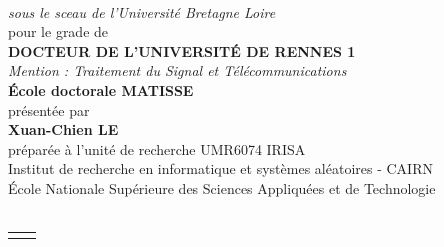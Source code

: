 \documentclass[10pt]{book}
\begin{document}
\begin{titlepage}
\begin{center}
\begin{minipage}{\glarg}
\vspace{0.5cm}
\\ \vspace{0mm}\emph{\Large sous le sceau de l'Universit\'e Bretagne Loire}\\ \vspace{0.5cm}
{\Large pour le grade de}\\ \vspace{2mm}
{\Large\bf DOCTEUR DE L'UNIVERSIT\'E DE RENNES 1}\\ \vspace{0.4cm}
\emph{\Large Mention :  Traitement du Signal et T\'el\'ecommunications}\\ \vspace{2mm}
{\Large\bf \'Ecole doctorale MATISSE}\\ \vspace{0.3cm}
{\Large pr\'esent\'ee par} \\ \vspace{3mm}
{\Huge\bf Xuan-Chien LE}\\ \vspace{0.4cm}
{\Large pr\'epar\'ee \`a l'unit\'e de recherche UMR6074 IRISA\\
\hspace{-1cm}Institut de recherche en informatique et syst\`emes al\'eatoires - CAIRN\\
\hspace{-1cm}\'Ecole Nationale Sup\'erieure des Sciences Appliqu\'ees et de Technologie}\vspace{0.3cm}
\\
\hspace{-20mm}{\rule{\Glarg}{1pt}}\\
\vspace{8mm}

\begin{tabular}{p{7cm}p{10cm}}
\begin{minipage}{\plarg}


\hspace{-1.8cm}{\huge\bf Improving}\vspace{5mm}

\hspace{-1.8cm}{\huge\bf Performance of}\vspace{5mm}


\end{minipage}
\end{tabular}
\end{minipage}
\end{center}
\end{titlepage}
\end{document}
